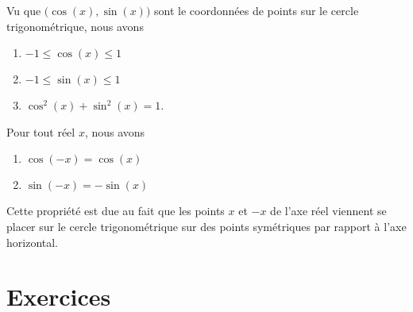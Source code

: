 \begin{propriete}
    Vu que \( \big( \cos(x),\sin(x) \big)\) sont le coordonnées de points sur le cercle trigonométrique, nous avons
    \begin{enumerate}
        \item
            \( -1\leq \cos(x)\leq 1\)
        \item
            \( -1\leq \sin(x)\leq 1\)
        \item
            \( \cos^2(x)+\sin^2(x)=1\).
    \end{enumerate}
\end{propriete}

\begin{propriete}
    Pour tout réel \( x\), nous avons
    \begin{enumerate}
        \item
            \( \cos(-x)=\cos(x)\)
        \item
        \( \sin(-x)=-\sin(x)\)
    \end{enumerate}
\end{propriete}
Cette propriété est due au fait que les points \( x\) et \( -x\) de l'axe réel viennent se placer sur le cercle trigonométrique sur des points symétriques par rapport à l'axe horizontal.

\section{Exercices}

